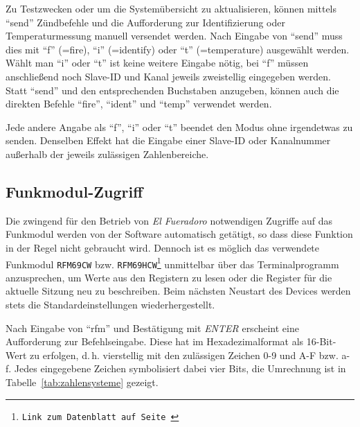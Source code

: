 \documentclass[paper=a4, parskip, numbers=noenddot, toc=listof, headsepline]{scrbook}
\newcommand{\anlage}{\emph{El Fueradoro}}
\begin{document}
				Zu Testzwecken oder um die Systemübersicht zu aktualisieren, können mittels \enquote{send} Zündbefehle und die Aufforderung zur Identifizierung oder Temperaturmessung manuell versendet werden. Nach Eingabe von \enquote{send} muss dies mit \enquote{f} (=fire), \enquote{i} (=identify) oder \enquote{t} (=temperature) ausgewählt werden. Wählt man \enquote{i} oder \enquote{t} ist keine weitere Eingabe nötig, bei \enquote{f} müssen anschließend noch Slave-ID und Kanal jeweils zweistellig eingegeben werden. Statt \enquote{send} und den entsprechenden Buchstaben anzugeben, können auch die direkten Befehle \mbox{\enquote{fire}}, \mbox{\enquote{ident}} und \mbox{\enquote{temp}} verwendet werden.

				Jede andere Angabe als \enquote{f}, \enquote{i} oder \enquote{t} beendet den Modus ohne irgendetwas zu senden. Denselben Effekt hat die Eingabe einer Slave-ID oder Kanalnummer außerhalb der jeweils zulässigen Zahlenbereiche.

			\subsection{Funkmodul-Zugriff}
				\label{sec:rfmzugriff}

				Die zwingend für den Betrieb von {\anlage} notwendigen Zugriffe auf das Funkmodul werden von der Software automatisch getätigt, so dass diese Funktion in der Regel nicht gebraucht wird. Dennoch ist es möglich das verwendete Funkmodul \texttt{RFM69CW} bzw. \texttt{RFM69HCW\footnote{Link zum Datenblatt auf Seite~\pageref{sec:datasheets}}} unmittelbar über das Terminalprogramm anzusprechen, um Werte aus den Registern zu lesen oder die Register für die aktuelle Sitzung neu zu beschreiben. Beim nächsten Neustart des Devices werden stets die Standardeinstellungen wiederhergestellt.

				Nach Eingabe von \enquote{rfm} und Bestätigung mit \emph{ENTER} erscheint eine Aufforderung zur Befehls\-eingabe. Diese hat im Hexadezimalformat als 16-Bit-Wert zu erfolgen, d.\,h. vierstellig mit den zulässigen Zeichen 0-9 und A-F bzw. a-f. Jedes eingegebene Zeichen symbolisiert dabei vier Bits, die Umrechnung ist in Tabelle~\ref{tab:zahlensysteme} gezeigt.
\end{document}
